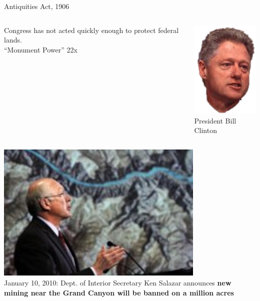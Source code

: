 \begin{frame}{Antiquities Act, 1906}
    \begin{columns}[onlytextwidth]
            \centering
            Congress has not acted quickly enough to protect federal lands. \\
            \vspace{20pt}
            { \Large{``Monument Power'' 22x}}

            \centering
            \includegraphics[width=.75\textwidth]{img/clinton.png} \\
            President Bill Clinton \\

    \end{columns}
\end{frame}

\begin{frame}
    \centering
    \includegraphics[width=0.75\textwidth]{img/salazar.png} \\
    January 10, 2010: Dept. of Interior Secretary Ken Salazar announces
    \textbf{new mining near the Grand Canyon will be banned on a million acres} \\
\end{frame}


